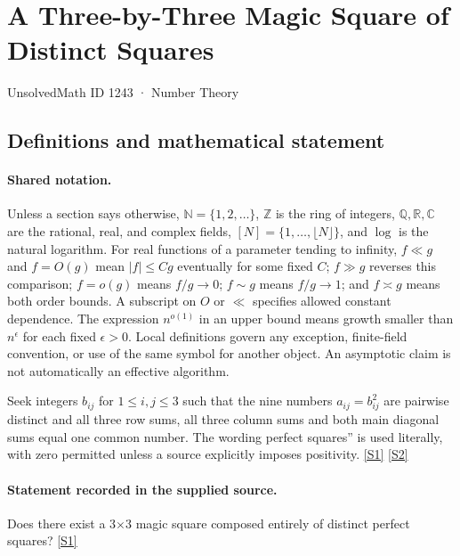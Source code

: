 \documentclass[11pt,a4paper]{article}
\newcommand{\N}{\mathbb{N}}
\newcommand{\Z}{\mathbb{Z}}
\newcommand{\Q}{\mathbb{Q}}
\newcommand{\R}{\mathbb{R}}
\newcommand{\C}{\mathbb{C}}
\newcommand{\sref}[2]{\hyperlink{source:#1:#2}{[S#2]}}
\begin{document}

\setcounter{section}{1242}

\section{A Three-by-Three Magic Square of Distinct Squares}\label{1243}

{\small\sffamily UnsolvedMath ID 1243 · Number Theory}

\subsection{Definitions and mathematical statement}

\paragraph{Shared notation.}Unless a section says otherwise, $\N=\{1,2,\ldots\}$,
$\Z$ is the ring of integers, $\Q,\R,\C$ are the rational, real, and complex
fields, $[N]=\{1,\ldots,\lfloor N\rfloor\}$, and $\log$ is the natural
logarithm. For real functions of a parameter tending to infinity,
$f\ll g$ and $f=O(g)$ mean $|f|\leq Cg$ eventually for some fixed $C$;
$f\gg g$ reverses this comparison; $f=o(g)$ means $f/g\to0$;
$f\sim g$ means $f/g\to1$; and $f\asymp g$ means both order bounds.
A subscript on $O$ or $\ll$ specifies allowed constant dependence.
The expression $n^{o(1)}$ in an upper bound means growth smaller than
$n^\epsilon$ for each fixed $\epsilon>0$. Local definitions govern any
exception, finite-field convention, or use of the same symbol for another
object. An asymptotic claim is not automatically an effective algorithm.



Seek integers $b_{ij}$ for $1\leq i,j\leq3$ such that the nine numbers $a_{ij}=b_{ij}^2$ are pairwise distinct and all three row sums, all three column sums and both main diagonal sums equal one common number. The wording perfect squares'' is used literally, with zero permitted unless a source explicitly imposes positivity. \sref{1243}{1} \sref{1243}{2}

\paragraph{Statement recorded in the supplied source.}
Does there exist a 3\ensuremath{×}3 magic square composed entirely of distinct perfect squares? \sref{1243}{1}
\end{document}
